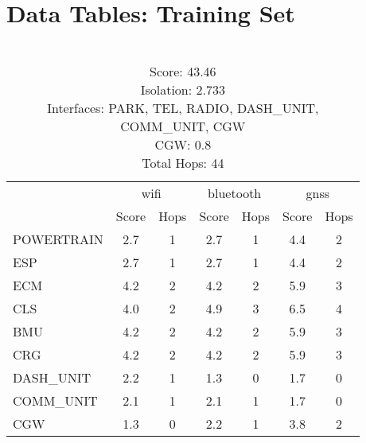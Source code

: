 \chapter{Data Tables: Training Set}
\label{apx:datatables}

\begin{table}[ht]
    \centering
    \caption{ \\ Score: 43.46 \\ Isolation: 2.733 \\ Interfaces: PARK, TEL, RADIO, DASH\_UNIT, COMM\_UNIT, CGW \\ CGW: 0.8 \\ Total Hops: 44}
    \label{tab:arch1}
    \begin{tabular}{lcccccc}
    \hline
     & \multicolumn{2}{c}{wifi} & \multicolumn{2}{c}{bluetooth} & \multicolumn{2}{c}{gnss} \\
     & Score & Hops & Score & Hops & Score & Hops \\
    \hline
    POWERTRAIN & 2.7 & 1 & 2.7 & 1 & 4.4 & 2 \\
    ESP & 2.7 & 1 & 2.7 & 1 & 4.4 & 2 \\
    ECM & 4.2 & 2 & 4.2 & 2 & 5.9 & 3 \\
    CLS & 4.0 & 2 & 4.9 & 3 & 6.5 & 4 \\
    BMU & 4.2 & 2 & 4.2 & 2 & 5.9 & 3 \\
    CRG & 4.2 & 2 & 4.2 & 2 & 5.9 & 3 \\
    DASH\_UNIT & 2.2 & 1 & 1.3 & 0 & 1.7 & 0 \\
    COMM\_UNIT & 2.1 & 1 & 2.1 & 1 & 1.7 & 0 \\
    CGW & 1.3 & 0 & 2.2 & 1 & 3.8 & 2 \\
    \hline
    \end{tabular}
\end{table}
    


